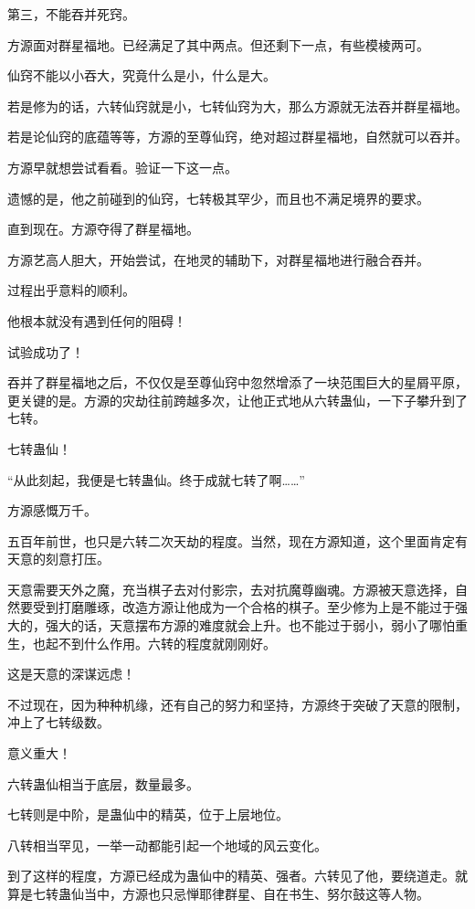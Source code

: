 \begin{this_body}
第三，不能吞并死窍。

方源面对群星福地。已经满足了其中两点。但还剩下一点，有些模棱两可。

仙窍不能以小吞大，究竟什么是小，什么是大。

若是修为的话，六转仙窍就是小，七转仙窍为大，那么方源就无法吞并群星福地。

若是论仙窍的底蕴等等，方源的至尊仙窍，绝对超过群星福地，自然就可以吞并。

方源早就想尝试看看。验证一下这一点。

遗憾的是，他之前碰到的仙窍，七转极其罕少，而且也不满足境界的要求。

直到现在。方源夺得了群星福地。

方源艺高人胆大，开始尝试，在地灵的辅助下，对群星福地进行融合吞并。

过程出乎意料的顺利。

他根本就没有遇到任何的阻碍！

试验成功了！

吞并了群星福地之后，不仅仅是至尊仙窍中忽然增添了一块范围巨大的星屑平原，更关键的是。方源的灾劫往前跨越多次，让他正式地从六转蛊仙，一下子攀升到了七转。

七转蛊仙！

“从此刻起，我便是七转蛊仙。终于成就七转了啊……”

方源感慨万千。

五百年前世，也只是六转二次天劫的程度。当然，现在方源知道，这个里面肯定有天意的刻意打压。

天意需要天外之魔，充当棋子去对付影宗，去对抗魔尊幽魂。方源被天意选择，自然要受到打磨雕琢，改造方源让他成为一个合格的棋子。至少修为上是不能过于强大的，强大的话，天意摆布方源的难度就会上升。也不能过于弱小，弱小了哪怕重生，也起不到什么作用。六转的程度就刚刚好。

这是天意的深谋远虑！

不过现在，因为种种机缘，还有自己的努力和坚持，方源终于突破了天意的限制，冲上了七转级数。

意义重大！

六转蛊仙相当于底层，数量最多。

七转则是中阶，是蛊仙中的精英，位于上层地位。

八转相当罕见，一举一动都能引起一个地域的风云变化。

到了这样的程度，方源已经成为蛊仙中的精英、强者。六转见了他，要绕道走。就算是七转蛊仙当中，方源也只忌惮耶律群星、自在书生、努尔鼓这等人物。


\end{this_body}
